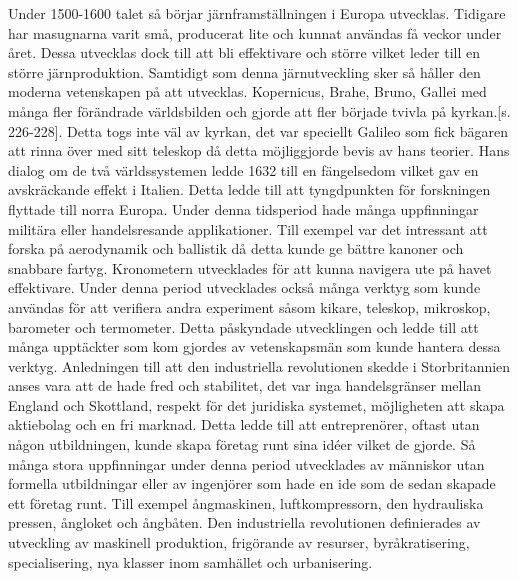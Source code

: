 \documentclass[a4paper,12pt]{article}
\begin{document}
\newline
\newline
Under 1500-1600 talet så börjar järnframställningen i Europa utvecklas. Tidigare har masugnarna varit små, producerat lite och kunnat användas få veckor under året. Dessa utvecklas dock till att bli effektivare och större vilket leder till en större järnproduktion. Samtidigt som denna järnutveckling sker så håller den moderna vetenskapen på att utvecklas. Kopernicus, Brahe, Bruno, Gallei med många fler förändrade världsbilden och gjorde att fler började tvivla på kyrkan.\cite{hansson}[s. 226-228]. Detta togs inte väl av kyrkan, det var speciellt Galileo som fick bägaren att rinna över med sitt teleskop då detta möjliggjorde bevis av hans teorier. Hans dialog om de två världssystemen ledde 1632 till en fängelsedom vilket gav en avskräckande effekt i Italien. Detta ledde till att tyngdpunkten för forskningen flyttade till norra Europa.\cite{dick}
\newline
\newline
Under denna tidsperiod hade många uppfinningar militära eller handelsresande applikationer. Till exempel var det intressant att forska på aerodynamik och ballistik då detta kunde ge bättre kanoner och snabbare fartyg. Kronometern utvecklades för att kunna navigera ute på havet effektivare. Under denna period utvecklades också många verktyg som kunde användas för att verifiera andra experiment såsom kikare, teleskop, mikroskop, barometer och termometer. Detta påskyndade utvecklingen och ledde till att många upptäckter som kom gjordes av vetenskapsmän som kunde hantera dessa verktyg. 
\newline
\newline
Anledningen till att den industriella revolutionen skedde i Storbritannien anses vara att de hade fred och stabilitet, det var inga handelsgränser mellan England och Skottland, respekt för det juridiska systemet, möjligheten att skapa aktiebolag och en fri marknad.\cite{landes} Detta ledde till att entreprenörer, oftast utan någon utbildningen, kunde skapa företag runt sina idéer vilket de gjorde. Så många stora uppfinningar under denna period utvecklades av människor utan formella utbildningar eller av ingenjörer som hade en ide som de sedan skapade ett företag runt. Till exempel ångmaskinen, luftkompressorn, den hydrauliska pressen, ångloket och ångbåten. Den industriella revolutionen definierades av utveckling av maskinell produktion, frigörande av resurser, byråkratisering, specialisering, nya klasser inom samhället och urbanisering.\cite{gyberg}
\end{document}
